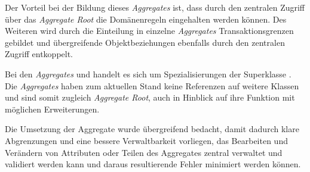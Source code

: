 Der Vorteil bei der Bildung dieses \textit{Aggregates} ist, dass durch den zentralen Zugriff über das \textit{Aggregate Root} die Domänenregeln eingehalten werden können.
Des Weiteren wird durch die Einteilung in einzelne \textit{Aggregates} Transaktionsgrenzen gebildet und übergreifende Objektbeziehungen ebenfalls durch den zentralen Zugriff entkoppelt.

Bei den \textit{Aggregates} \href{https://github.com/lucasmerkel/dhbw-advancedswe-programmentwurf/blob/5764d7da4cfd0562ed8e96128e92f85c30b7309d/swe_programmentwurf/consumergoods-inventory-planner/3-cip-domain/src/main/java/de/dhbw/cip/domain/Fridge.java}{} und \href{https://github.com/lucasmerkel/dhbw-advancedswe-programmentwurf/blob/5764d7da4cfd0562ed8e96128e92f85c30b7309d/swe_programmentwurf/consumergoods-inventory-planner/3-cip-domain/src/main/java/de/dhbw/cip/domain/FoodShelf.java}{} handelt es sich um Spezialisierungen der Superklasse \href{https://github.com/lucasmerkel/dhbw-advancedswe-programmentwurf/blob/5764d7da4cfd0562ed8e96128e92f85c30b7309d/swe_programmentwurf/consumergoods-inventory-planner/3-cip-domain/src/main/java/de/dhbw/cip/domain/Storage.java}{}.
Die \textit{Aggregates} haben zum aktuellen Stand keine Referenzen auf weitere Klassen und sind somit zugleich \textit{Aggregate Root}, auch in Hinblick auf ihre Funktion mit möglichen Erweiterungen.

Die Umsetzung der Aggregate wurde übergreifend bedacht, damit dadurch klare Abgrenzungen und eine bessere Verwaltbarkeit vorliegen, das Bearbeiten und Verändern von Attributen oder Teilen des Aggregates zentral verwaltet und validiert werden kann und daraus resultierende Fehler minimiert werden können.

